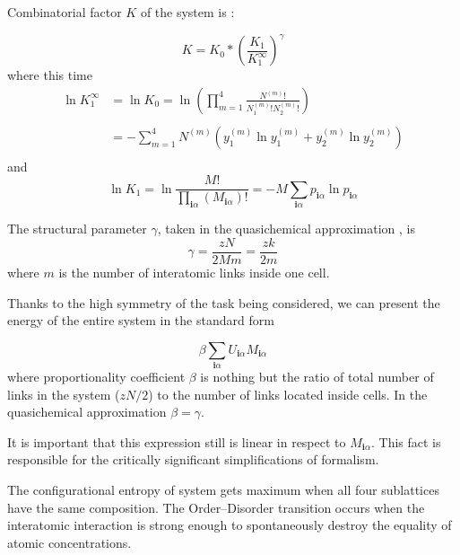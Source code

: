 \documentclass[12pt,abstract]{scrartcl}
\begin{document}
Combinatorial factor $K$ of the system  is \cite{TISR_p1}:

\begin{equation} \label{config_final}
K =K_0 * \left( \frac{K_1}{K_1^\infty} \right)^\gamma 
\end{equation}
where this time
\begin{equation} \label{K03}
\begin{split}
\ln K_1^\infty &= \ln K_0   = \ln \left( \prod_{m = 1}^4  \frac{N^{(m)}!}{N_1^{(m)}! N_2^{(m)}!}  \right)\\
\\
& = -  \sum_{m = 1}^4  N^{(m)} ( y_1^{(m)} \ln y_1^{(m)} + y_2^{(m)} \ln y_2^{(m)} )\\
\end{split}
\end{equation}
and
\begin{equation} \label{K13}
\ln K_1 = \ln \frac{M!}{\prod\limits_{\mathbf{i}  \alpha} ( M_{\mathbf{i}  \alpha})!} 
= - M \sum_{\mathbf{i}  \alpha} p_{\mathbf{i}  \alpha} \ln p_{\mathbf{i}  \alpha}
\end{equation}

The structural parameter $\gamma$,  taken  in the quasichemical approximation \cite{TISR_p2}, is
\begin{equation} \label{gamma}
\gamma = \frac{z N}{2 M m} = \frac{z k}{2 m}
\end{equation}
where $m$ is the number of interatomic links inside one cell.

Thanks to the high symmetry of the task being considered, we can present the energy of the entire system in the standard  \cite{TISR_p1} form


 \[
\beta \sum_{\mathbf{i}  \alpha}U_{\mathbf{i}  \alpha} M_{\mathbf{i}  \alpha} 
\]
where proportionality coefficient $\beta$ is nothing but the ratio of total number of links in the system ($z N / 2$) to the number of links located inside cells.
In the quasichemical approximation $\beta = \gamma$.




It is important that this  expression still is linear in respect to $M_{\mathbf{i}  \alpha} $. 
This fact is responsible  \cite{TISR_p1} for the critically significant simplifications of formalism.

The configurational entropy of system gets maximum when all four sublattices have the same composition.
The  Order--Disorder  transition occurs when the interatomic interaction is strong enough to spontaneously destroy  the  equality of atomic concentrations.
\end{document}
